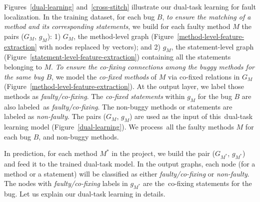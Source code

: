 Figures~\ref{dual-learning} and~\ref{cross-stitch} illustrate our
dual-task learning for fault localization. In the training dataset,
for each bug $B$, {\em to ensure the matching of a method and its
  corresponding statements}, we build for each faulty method $M$ the
pairs ($G_M$, $g_M$): 1) $G_M$, the method-level graph
(Figure~\ref{method-level-feature-extraction} with nodes replaced by
vectors); and 2) $g_M$, the statement-level graph
(Figure~\ref{statement-level-feature-extraction}) containing all the
statements belonging to $M$. {\em To ensure the co-fixing connections
  among the buggy methods for the same bug $B$}, we model the {\em
  co-fixed methods} of $M$ via co-fixed relations in $G_M$
(Figure~\ref{method-level-feature-extraction}). At the output layer,
we label those methods as {\em faulty/co-fixing}. The {\em co-fixed
  statements} within $g_M$ for the bug $B$ are also labeled~as {\em
  faulty/co-fixing}. The non-buggy methods or statements are
labeled as {\em non-faulty}. The pairs ($G_M$, $g_M$) are used as the
input of this~dual-task learning model
(Figure~\ref{dual-learning}). We process~all the faulty methods $M$
for each bug $B$, and non-buggy methods.

In prediction, for each method $M^{*}$ in the project, we build the
pair ($G_{M^{*}}$, $g_{M^{*}}$) and feed it to the trained dual-task
model. In the output graphs, each node (for a method or a statement)
will be classified as either {\em faulty/co-fixing} or {\em
  non-faulty}. The nodes with {\em faulty/co-fixing} labels in
$g_{M^{*}}$ are the~co-fixing statements for the bug. Let us explain
our dual-task learning in details.








